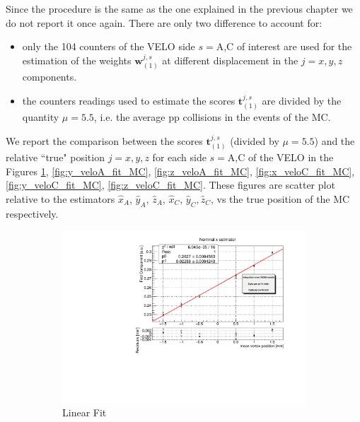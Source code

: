 Since the procedure is the same as the one explained in the previous chapter we do not report it once again. There are only two difference to account for:
\begin{itemize}
    \item only the 104 counters of the VELO side $s=$A,C of interest are used for the estimation of the weights $\mathbf{w}^{j,s}_{(1)}$ at different displacement in the $j=x,y,z$ components.
    \item the counters readings used to estimate the scores $\mathbf{t}^{j,s}_{(1)}$ are divided by the quantity $\mu=5.5$, i.e. the average pp collisions in the events of the MC.
\end{itemize}
We report the comparison between the scores $\mathbf{t}^{j,s}_{(1)}$ (divided by $\mu=5.5$) and the relative ``true" position $j=x,y,z$ for each side $s=$A,C of the VELO in the Figures \ref{fig:x_veloA_fit_MC}, \ref{fig:y_veloA_fit_MC}, \ref{fig:z_veloA_fit_MC}, \ref{fig:x_veloC_fit_MC}, \ref{fig:y_veloC_fit_MC}, \ref{fig:z_veloC_fit_MC}. These figures are scatter plot relative to the estimators $\hat{x}_A$, $\hat{y}_A$, $\hat{z}_A$, $\hat{x}_C$, $\hat{y}_C$$, \hat{z}_C$,  vs the true position of the MC respectively.
\begin{figure}
    \centering
    \begin{subfigure}{0.48\textwidth}
    \includegraphics[width=\linewidth]{figures/x_fit_veloA_MC_normalized.pdf}
    \caption{Linear Fit}\label{fig:x_veloA_fit_MC}
    \end{subfigure}
    \begin{subfigure}{0.48\textwidth}

\end{subfigure}
\end{figure}$$
